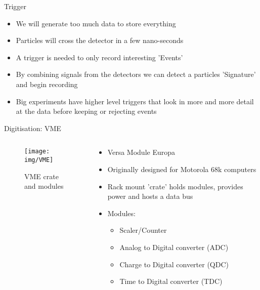 \documentclass[9pt]{beamer}
\begin{document}
\begin{frame}{Trigger}
  \begin{itemize}
    \item We will generate too much data to store everything
    \item Particles will cross the detector in a few nano-seconds
    \item A trigger is needed to only record interesting 'Events'
    \item By combining signals from the detectors we can detect a particles 'Signature' and begin recording
    \item Big experiments have higher level triggers that look in more and more detail at the data before keeping or rejecting events
  \end{itemize}
\end{frame}

\begin{frame}{Digitisation: VME}
  \begin{columns}
    \begin{column}{.6\textwidth}
    \vspace*{-0.5cm}
    \begin{figure}\texttt{[image: img/VME]}\vspace*{-0.2cm}\caption{VME crate and modules}\end{figure}\vspace*{-1cm}
    \end{column}
    \begin{column}{.4\textwidth}
    \vspace*{-0.5cm}
    \begin{itemize}
        \item Versa Module Europa
        \item Originally designed for Motorola 68k computers
        \item Rack mount 'crate' holds modules, provides power and hosts a data bus
        \item Modules:
          \begin{itemize}
            \item Scaler/Counter
            \item Analog to Digital converter (ADC)
            \item Charge to Digital converter (QDC)
            \item Time to Digital converter (TDC)
          \end{itemize}
    \end{itemize}
    \end{column}
  \end{columns}
\end{frame}
\end{document}
